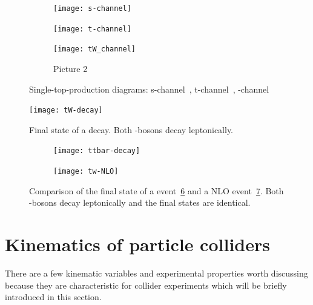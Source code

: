 \begin{figure}[htbp]
  \begin{subfigure}[b]{0.3\textwidth}
  	\centering
    \texttt{[image: s-channel]}
    \caption{}
    \label{fig:singletop:virtualWt}
  \end{subfigure}
  \quad
  \begin{subfigure}[b]{0.3\textwidth}
  	\centering
    \texttt{[image: t-channel]}
    \caption{}
    \label{fig:singletop:virtualWs}
  \end{subfigure}
  \quad
  \begin{subfigure}[b]{0.3\textwidth}
  	\centering
    \texttt{[image: tW\_channel]}
    \caption{Picture 2}
	\label{fig:singletop:tW}
  \end{subfigure} 
  \caption[Single-top-production diagrams]{Single-top-production diagrams: s-channel~, t-channel~, \tW-channel~}
  \label{fig:singletop}
\end{figure}


\begin{figure}[htbp]
	\centering
	\texttt{[image: tW-decay]}
	\caption[Final state of a \tW decay]{Final state of a \tW decay. Both \PW-bosons decay leptonically.}
	\label{fig:tw-decay}
\end{figure}

\begin{figure}[htbp]
    \centering
    \begin{subfigure}[b]{0.44\textwidth}
        \texttt{[image: ttbar-decay]}
        \caption{}
        \label{fig:nlo:ttbar}
    \end{subfigure}
\quad
    \begin{subfigure}[b]{0.44\textwidth}
        \texttt{[image: tw-NLO]}
        \caption{}
        \label{fig:nlo:tw}
    \end{subfigure}
    \caption[Comparison of the final state of a \ttbar and \tW event]{Comparison of the final state of a \ttbar event~\ref{fig:nlo:ttbar} and a NLO \tW event~\ref{fig:nlo:tw}. Both \PW-bosons decay leptonically and the final states are identical.}
	\label{fig:nlo}
\end{figure}



\section{Kinematics of particle colliders}

There are a few kinematic variables and experimental properties worth discussing because they are characteristic for collider experiments which will be briefly introduced in this section.

